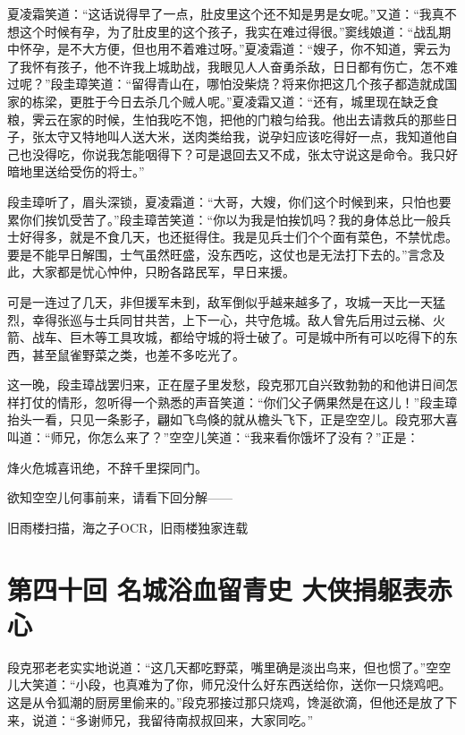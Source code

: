 \documentclass[12pt,oneside]{book}
\begin{document}
夏凌霜笑道：``这话说得早了一点，肚皮里这个还不知是男是女呢。''又道：``我真不想这个时候有孕，为了肚皮里的这个孩子，我实在难过得很。''窦线娘道：``战乱期中怀孕，是不大方便，但也用不着难过呀。''夏凌霜道：``嫂子，你不知道，霁云为了我怀有孩子，他不许我上城助战，我眼见人人奋勇杀敌，日日都有伤亡，怎不难过呢？''段圭璋笑道：``留得青山在，哪怕没柴烧？将来你把这几个孩子都造就成国家的栋梁，更胜于今日去杀几个贼人呢。''夏凌霜又道：``还有，城里现在缺乏食粮，霁云在家的时候，生怕我吃不饱，把他的门粮匀给我。他出去请救兵的那些日子，张太守又特地叫人送大米，送肉类给我，说孕妇应该吃得好一点，我知道他自己也没得吃，你说我怎能咽得下？可是退回去又不成，张太守说这是命令。我只好暗地里送给受伤的将士。''

段圭璋听了，眉头深锁，夏凌霜道：``大哥，大嫂，你们这个时候到来，只怕也要累你们挨饥受苦了。''段圭璋苦笑道：``你以为我是怕挨饥吗？我的身体总比一般兵士好得多，就是不食几天，也还挺得住。我是见兵士们个个面有菜色，不禁忧虑。要是不能早日解围，士气虽然旺盛，没东西吃，这仗也是无法打下去的。''言念及此，大家都是忧心忡仲，只盼各路民军，早日来援。

可是一连过了几天，非但援军未到，敌军倒似乎越来越多了，攻城一天比一天猛烈，幸得张巡与士兵同甘共苦，上下一心，共守危城。敌人曾先后用过云梯、火箭、战车、巨木等工具攻城，都给守城的将士破了。可是城中所有可以吃得下的东西，甚至鼠雀野菜之类，也差不多吃光了。

这一晚，段圭璋战罢归来，正在屋子里发愁，段克邪兀自兴致勃勃的和他讲日间怎样打仗的情形，忽听得一个熟悉的声音笑道：``你们父子俩果然是在这儿！''段圭璋抬头一看，只见一条影子，翩如飞鸟倏的就从檐头飞下，正是空空儿。段克邪大喜叫道：``师兄，你怎么来了？''空空儿笑道：``我来看你饿坏了没有？''正是：

烽火危城喜讯绝，不辞千里探同门。

欲知空空儿何事前来，请看下回分解------

旧雨楼扫描，海之子OCR，旧雨楼独家连载

\chapter{第四十回 名城浴血留青史
大侠捐躯表赤心}\label{ux7b2cux56dbux5341ux56de-ux540dux57ceux6d74ux8840ux7559ux9752ux53f2-ux5927ux4fa0ux6350ux8eafux8868ux8d64ux5fc3}

段克邪老老实实地说道：``这几天都吃野菜，嘴里确是淡出鸟来，但也惯了。''空空儿大笑道：``小段，也真难为了你，师兄没什么好东西送给你，送你一只烧鸡吧。这是从令狐潮的厨房里偷来的。''段克邪接过那只烧鸡，馋涎欲滴，但他还是放了下来，说道：``多谢师兄，我留待南叔叔回来，大家同吃。''
\end{document}
